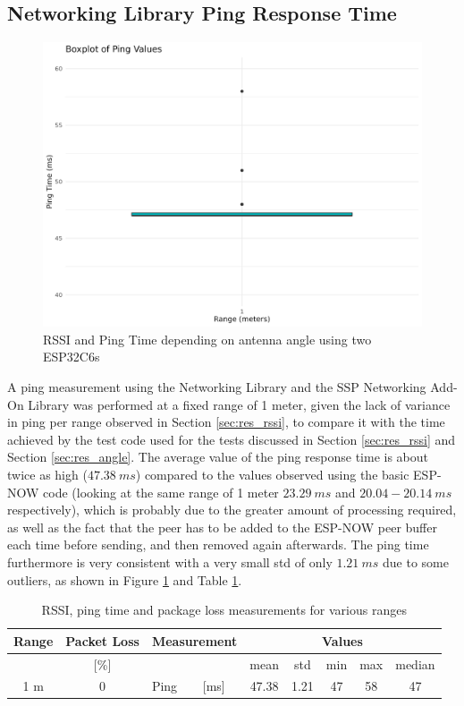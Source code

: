 \subsection{\label{sec:res_ping}Networking Library Ping Response Time}

\begin{figure}[H]
    \centering
    \includegraphics[width=.45\textwidth]{rstudio/analysis/plots/ping_net_ping.png}
    \vspace{\ftspace}
    \caption{RSSI and Ping Time depending on antenna angle using two ESP32C6s}
    \label{fig:net_ping}
\end{figure}

A ping measurement using the Networking Library and the SSP Networking Add-On Library was performed at a fixed range of 1 meter, given the lack of variance in ping per range observed in Section \ref{sec:res_rssi}, to compare it with the time achieved by the test code used for the tests discussed in Section \ref{sec:res_rssi} and Section \ref{sec:res_angle}. The average value of the ping response time is about twice as high ($47.38\ ms$) compared to the values observed using the basic ESP-NOW code (looking at the same range of 1 meter $23.29\ ms$ and $20.04-20.14\ ms$ respectively), which is probably due to the greater amount of processing required, as well as the fact that the peer has to be added to the ESP-NOW peer buffer each time before sending, and then removed again afterwards. The ping time furthermore is very consistent with a very small std of only $1.21\ ms$ due to some outliers, as shown in Figure \ref{fig:net_ping} and Table \ref{tab:ping}. 

\begin{table}[H]
    \centering
    \begin{tabular}{|c|c|l|l|c|c|c|c|c|}
    \hline
        Range & Packet Loss & \multicolumn{2}{l|}{Measurement} & \multicolumn{5}{c|}{Values} \\\hline
        [meters] & [\%] & \multicolumn{2}{l|}{} & mean & std & min & max & median \\\hline\hline
        1 m & 0 & Ping & [ms] & 47.38 & 1.21 & 47 & 58 & 47 \\\hline
    \end{tabular}
    \vspace{\ftspace}
    \caption{RSSI, ping time and package loss measurements for various ranges}
    \label{tab:ping}
\end{table}

